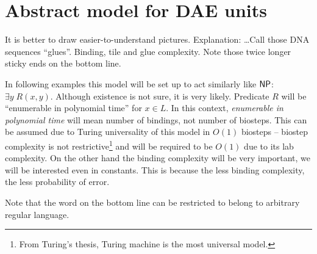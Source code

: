 \section{Abstract model for DAE units}

It is better to draw easier-to-understand pictures. Explanation: \ldots Call those DNA sequences ``glues''. Binding, tile and glue complexity. Note those twice longer sticky ends on the bottom line.

In following examples this model will be set up to act similarly like $\mathsf{NP}$: $\exists y \; R(x,y)$. Although existence is not sure, it is very likely. Predicate $R$ will be ``enumerable in polynomial time'' for $x \in L$. In this context, {\em enumerable in polynomial time} will mean number of bindings, not number of biosteps. This can be assumed due to Turing universality of this model in $O(1)$ biosteps -- biostep complexity is not restrictive\footnote{From Turing's thesis, Turing machine is the most universal model.} and will be required to be $O(1)$ due to its lab complexity. On the other hand the binding complexity will be very important, we will be interested even in constants. This is because the less binding complexity, the less probability of error.

Note that the word on the bottom line can be restricted to belong to arbitrary regular language.


